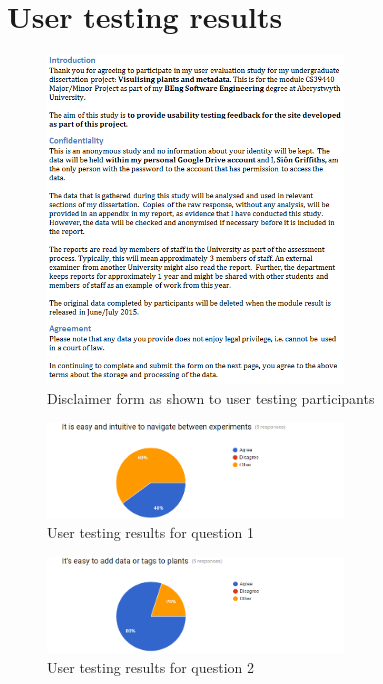 \chapter{User testing results}\label{apxUT}

\begin{figure}[H]
    \centering
    \includegraphics[width=0.7\textwidth]{images/userFeedback/disclaimer}
    \caption{Disclaimer form as shown to user testing participants}
    \label{fig:jmeter_no_data}
\end{figure} 


\begin{figure}[H]
    \centering
    \includegraphics[width=0.7\textwidth]{images/userFeedback/q1}
    \caption{User testing results for question 1}
    \label{fig:jmeter_no_data}
\end{figure} 

\begin{figure}[H]
    \centering
    \includegraphics[width=0.7\textwidth]{images/userFeedback/q2}
    \caption{User testing results for question 2}
    \label{fig:jmeter_no_data}
\end{figure} 

